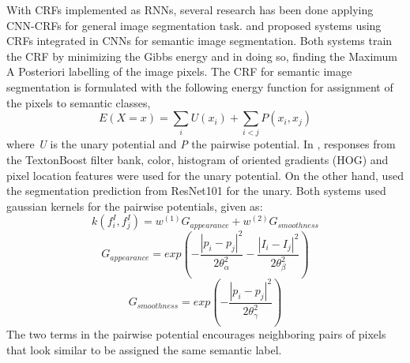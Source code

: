 \documentclass[journal]{IEEEtran}
\begin{document}
With CRFs implemented as RNNs, several research has been done applying CNN-CRFs for general image segmentation task. \cite{NIPS2011_4296} and \cite{Teichmann2018ConvolutionalCF} proposed systems using CRFs integrated in CNNs for semantic image segmentation. Both systems train the CRF by minimizing the Gibbs energy and in doing so, finding the Maximum A Posteriori labelling of the image pixels. The CRF for semantic image segmentation is formulated with the following energy function for assignment of the pixels to semantic classes,
\begin{equation}
E(X = x) = \sum_i U(x_i) + \sum_{i<j}P(x_i,x_j)
\end{equation}
where \textit{U} is the unary potential and \textit{P} the pairwise potential. In \cite{NIPS2011_4296}, responses from the TextonBoost filter bank, color, histogram of oriented gradients (HOG) and pixel location features were used for the unary potential. On the other hand, \cite{Teichmann2018ConvolutionalCF} used the segmentation prediction from ResNet101 for the unary. Both systems used gaussian kernels for the pairwise potentials, given as:
\begin{equation}
k(f_i^I,f_j^I) = w^{(1)}G_{appearance} + w^{(2)}G_{smoothness}
\end{equation}
\begin{equation}
G_{appearance} = exp\left(-\frac{|p_i - p_j|^2}{2\theta_\alpha^2} - \frac{|I_i - I_j|^2}{2\theta_\beta^2}\right)
\end{equation}
\begin{equation}
G_{smoothness} = exp\left(-\frac{|p_i - p_j|^2}{2\theta_\gamma^2}\right)
\end{equation}
The two terms in the pairwise potential encourages neighboring pairs of pixels that look similar to be assigned the same semantic label.
\end{document}
